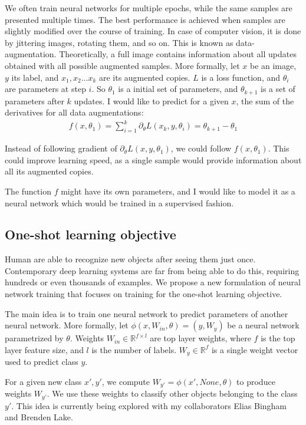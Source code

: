 \documentclass{article}
\begin{document}
We often train neural networks for multiple epochs, while the same 
samples are presented multiple times. The best performance is
achieved when samples are slightly modified over the course of training.
In case of computer vision, it is done by jittering images, rotating
them, and so on. This is known as data-augmentation. 
Theoretically, a full image contains information about all updates obtained
with all possible augmented samples. More formally, let $x$ be an image, $y$ its label, and
$x_1, x_2 \dots x_k$ are its augmented copies. $L$ is a loss function, and $\theta_i$ are parameters at step $i$. So $\theta_1$ is a initial set of parameters, and $\theta_{k+1}$ is a set of parameters after $k$ updates. 
I would like to
predict for a given $x$, the sum of the derivatives for all data augmentations:
\begin{align}
  f(x, \theta_1) = \sum_{i=1}^k \partial_\theta L(x_k, y, \theta_i) = \theta_{k+1} - \theta_1
\end{align}

Instead of following gradient of $\partial_\theta L(x, y, \theta_1)$, we could
follow $f(x, \theta_1)$.
This could improve learning speed, as a single sample would provide
information about all its augmented copies. 

The function $f$ might have its own parameters, and I would like to model it 
as a neural network which would be trained in a supervised fashion. 

\subsection{One-shot learning objective}
Human are able to recognize new objects after seeing them just once.
Contemporary deep learning systems are far from being able to do this,
requiring hundreds or even thousands of examples.  We propose a new
formulation of neural network training that focuses on training for the
one-shot learning objective.

The main idea is to train one neural network to predict parameters of another neural network. 
More formally, let $\phi(x, W_{in}, \theta) = (y, W_{y})$ be a neural network parametrized
by $\theta$. Weights $W_{in} \in \mathbb{R}^{f \times l}$ are top layer weights, where
$f$ is the top layer feature size, and $l$ is the number of labels. $W_{y} \in \mathbb{R}^f$ is a
single weight vector used to predict class $y$.

For a given new class $x', y'$, we compute $ W_{y'} = \phi(x', None, \theta)$ to produce weights $W_{y'}$. 
We use these weights to classify
other objects belonging to the class $y'$.
This idea is currently being explored with my collaborators Elias Bingham and Brenden Lake.
\end{document}
